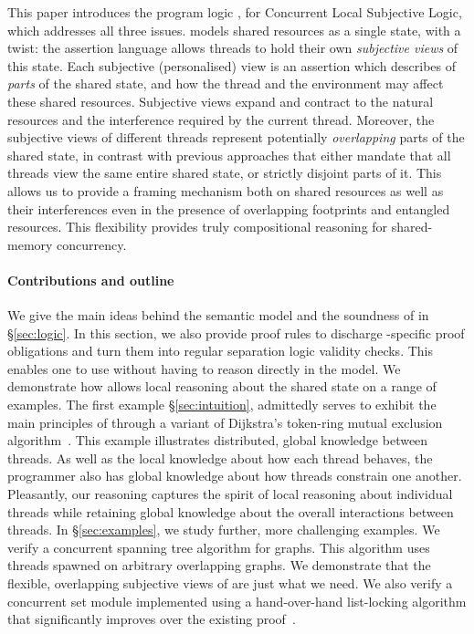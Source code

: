 This paper introduces the program logic \colosl, for Concurrent Local
Subjective Logic, which addresses all three issues. \colosl models
shared resources as a single state, with a twist: the assertion
language allows threads to hold their own \emph{subjective views} of
this state. Each subjective (personalised) view is an assertion which
describes of \emph{parts} of the shared state, and how the thread and
the environment may affect these shared resources. Subjective views
expand and contract to the natural resources and the interference
required by the current thread. Moreover, the subjective views of
different threads represent potentially \emph{overlapping} parts of
the shared state, in contrast with previous approaches that either
mandate that all threads view the same entire shared state, or
strictly disjoint parts of it. This allows us to provide a framing
mechanism both on shared resources as well as their interferences even
in the presence of overlapping footprints and entangled
resources. This flexibility provides truly compositional reasoning for
shared-memory concurrency.

\paragraph{Contributions and outline} 
We give the main ideas behind the semantic model and the soundness of
\colosl in \S\ref{sec:logic}. In this section, we also provide proof
rules to discharge \colosl-specific proof obligations and turn them
into regular separation logic validity checks. This enables one to use
\colosl without having to reason directly in the model. We demonstrate
how \colosl allows local reasoning about the shared state on a range
of examples.  The first example \S\ref{sec:intuition}, admittedly
serves to exhibit the main principles of \colosl through a variant of
Dijkstra's token-ring mutual exclusion
algorithm~\cite{dijkstra74}. This example illustrates distributed,
global knowledge between threads. As well as the local knowledge about
how each thread behaves, the programmer also has global knowledge
about how threads constrain one another. Pleasantly, our reasoning
captures the spirit of local reasoning about individual threads while
retaining global knowledge about the overall interactions between
threads. In \S\ref{sec:examples}, we study further, more challenging
examples. We verify a concurrent spanning tree algorithm for
graphs. This algorithm uses threads spawned on arbitrary overlapping
graphs. We demonstrate that the flexible, overlapping subjective views
of \colosl are just what we need.  We also verify a concurrent set
module implemented using a hand-over-hand list-locking algorithm that
significantly improves over the existing proof~\cite{cap-ecoop10}.
%

